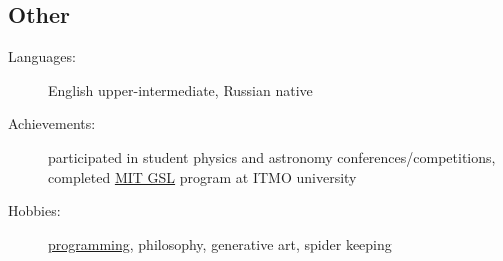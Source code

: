 \documentclass[11pt]{report}
\begin{document}
\subsection*{Other}
\begin{description}
    \item[Languages:]
    English upper-intermediate, Russian native
    \item[Achievements:]
    participated in student physics and astronomy conferences/competitions,
    completed \href{https://gsl.mit.edu/}{MIT GSL} program at ITMO university
    \item[Hobbies:]
    \href{https://github.com/unsip}{programming}, philosophy, generative art, spider keeping
\end{description}
\end{document}
